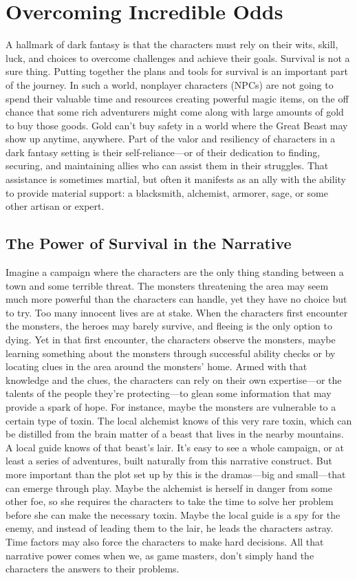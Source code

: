 \documentclass[10pt,a4paper,twoside,twocolumn,openany,bg=print,nodeprecatedcode]{dndbook}
\begin{document}
\section{Overcoming Incredible Odds}
A hallmark of dark fantasy is that the characters must rely on their wits, skill, luck, and choices to overcome challenges and achieve their goals. Survival is not a sure thing. Putting together the plans and tools for survival is an important part of the journey.
In such a world, nonplayer characters (NPCs) are not going to spend their valuable time and resources creating powerful magic items, on the off chance that some rich adventurers might come along with large amounts of gold to buy those goods. Gold can't buy safety in a world where the Great Beast may show up anytime, anywhere.
Part of the valor and resiliency of characters in a dark fantasy setting is their self-reliance—or of their dedication to finding, securing, and maintaining allies who can assist them in their struggles. That assistance is sometimes martial, but often it manifests as an ally with the ability to provide material support: a blacksmith, alchemist, armorer, sage, or some other artisan or expert.
\subsection{The Power of Survival in the Narrative}
Imagine a campaign where the characters are the only thing standing between a town and some terrible threat. The monsters threatening the area may seem much more powerful than the characters can handle, yet they have no choice but to try. Too many innocent lives are at stake.
When the characters first encounter the monsters, the heroes may barely survive, and fleeing is the only option to dying. Yet in that first encounter, the characters observe the monsters, maybe learning something about the monsters through successful ability checks or by locating clues in the area around the monsters' home.
Armed with that knowledge and the clues, the characters can rely on their own expertise—or the talents of the people they're protecting—to glean some information that may provide a spark of hope. For instance, maybe the monsters are vulnerable to a certain type of toxin.
The local alchemist knows of this very rare toxin, which can be distilled from the brain matter of a beast that lives in the nearby mountains. A local guide knows of that beast's lair.
It's easy to see a whole campaign, or at least a series of adventures, built naturally from this narrative construct. But more important than the plot set up by this is the dramas—big and small—that can emerge through play.
Maybe the alchemist is herself in danger from some other foe, so she requires the characters to take the time to solve her problem before she can make the necessary toxin. Maybe the local guide is a spy for the enemy, and instead of leading them to the lair, he leads the characters astray. Time factors may also force the characters to make hard decisions. All that narrative power comes when we, as game masters, don't simply hand the characters the answers to their problems.
\end{document}

